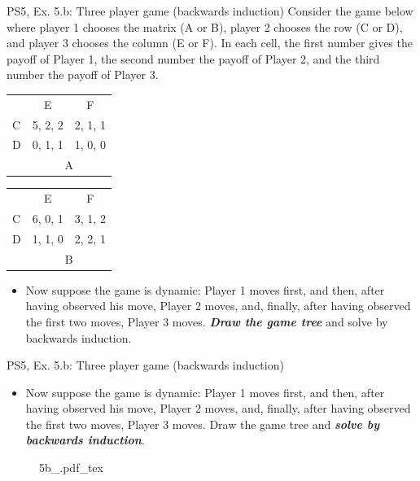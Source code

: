 \begin{frame}{PS5, Ex. 5.b: Three player game (backwards induction)}
    Consider the game below where player 1 chooses the matrix (A or B), player 2 chooses the row (C or D), and player 3 chooses the column (E or F). In each cell, the first number gives the payoff of Player 1, the second number the payoff of Player 2, and the third number the payoff of Player 3.
    \begin{table}
      \begin{tabular}{l|c|c|}
        \multicolumn{1}{c}{} & \multicolumn{1}{c}{E} & \multicolumn{1}{c}{F} \\\cline{2-3}
        C & 5, 2, 2 & 2, 1, 1 \\\cline{2-3}
        D & 0, 1, 1 & 1, 0, 0 \\\cline{2-3}
        \multicolumn{1}{c}{} & \multicolumn{2}{c}{A}
      \end{tabular}\quad
      \begin{tabular}{l|c|c|}
        \multicolumn{1}{c}{} & \multicolumn{1}{c}{E} & \multicolumn{1}{c}{F} \\\cline{2-3}
        C & 6, 0, 1 & 3, 1, 2 \\\cline{2-3}
        D & 1, 1, 0 & 2, 2, 1 \\\cline{2-3}
        \multicolumn{1}{c}{} & \multicolumn{2}{c}{B}
      \end{tabular}
    \end{table}
    \begin{itemize}
      \item[(b)] Now suppose the game is dynamic: Player 1 moves first, and then, after having observed his move, Player 2 moves, and, finally, after having observed the first two moves, Player 3 moves. \textbf{\textit{Draw the game tree}} and solve by backwards induction.
    \end{itemize}
  \vfill\null
\end{frame}
\begin{frame}{PS5, Ex. 5.b: Three player game (backwards induction)}
    \begin{itemize}
      \item[(b)] Now suppose the game is dynamic: Player 1 moves first, and then, after having observed his move, Player 2 moves, and, finally, after having observed the first two moves, Player 3 moves. Draw the game tree and \textbf{\textit{solve by backwards induction}}.
    \end{itemize}
    \vspace{-10pt}
    \begin{figure}[!h]
      \center
      \def\svgwidth{\columnwidth}
      {5b_.pdf_tex}
    \end{figure}
  \vfill\null
\end{frame}
